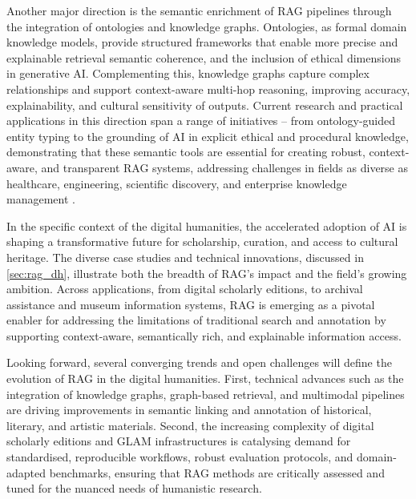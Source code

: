 \begin{spacing}{1.5}
Another major direction is the semantic enrichment of RAG pipelines through the integration of ontologies and knowledge graphs. Ontologies, as formal domain knowledge models, provide structured frameworks that enable more precise and explainable retrieval semantic coherence, and the inclusion of ethical dimensions in generative AI. Complementing this, knowledge graphs capture complex relationships and support context-aware multi-hop reasoning, improving accuracy, explainability, and cultural sensitivity of outputs. Current research and practical applications in this direction span a range of initiatives – from ontology-guided entity typing to the grounding of AI in explicit ethical and procedural knowledge, demonstrating that these semantic tools are essential for creating robust, context-aware, and transparent RAG systems, addressing challenges in fields as diverse as healthcare, engineering, scientific discovery, and enterprise knowledge management \citep{tiwari_ontorag_2025, ludwig_ontology-based_2025, bran_ontology-retrieval_2024, sharma_og-rag_2024, xiao_orag_2024, park_ontology-based_2024, debellis_integrating_2024,franco_ontology-based_2020}.

In the specific context of the digital humanities, the accelerated adoption of AI is shaping a transformative future for scholarship, curation, and access to cultural heritage. The diverse case studies and technical innovations, discussed in \autoref{sec:rag_dh}, illustrate both the breadth of RAG’s impact and the field’s growing ambition. Across applications, from digital scholarly editions, to archival assistance and museum information systems, RAG is emerging as a pivotal enabler for addressing the limitations of traditional search and annotation by supporting context-aware, semantically rich, and explainable information access.

Looking forward, several converging trends and open challenges will define the evolution of RAG in the digital humanities. First, technical advances such as the integration of knowledge graphs, graph-based retrieval, and multimodal pipelines are driving improvements in semantic linking and annotation of historical, literary, and artistic materials. Second, the increasing complexity of digital scholarly editions and GLAM infrastructures is catalysing demand for standardised, reproducible workflows, robust evaluation protocols, and domain-adapted benchmarks, ensuring that RAG methods are critically assessed and tuned for the nuanced needs of humanistic research.


\end{spacing}
